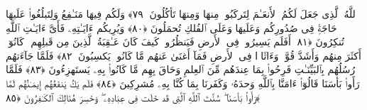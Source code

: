  ٱللَّهُ ٱلَّذِى جَعَلَ لَكُمُ ٱلأَنعَـٰمَ لِتَركَبُوا۟ مِنهَا وَمِنهَا تَأكُلُونَ ﴿٧٩﴾
 وَلَكُم فِيهَا مَنَـٰفِعُ وَلِتَبلُغُوا۟ عَلَيهَا حَاجَةًۭ فِى صُدُورِكُم وَعَلَيهَا وَعَلَى ٱلفُلكِ تُحمَلُونَ ﴿٨٠﴾
 وَيُرِيكُم ءَايَـٰتِهِۦ فَأَىَّ ءَايَـٰتِ ٱللَّهِ تُنكِرُونَ ﴿٨١﴾
 أَفَلَم يَسِيرُوا۟ فِى ٱلأَرضِ فَيَنظُرُوا۟ كَيفَ كَانَ عَـٰقِبَةُ ٱلَّذِينَ مِن قَبلِهِم ۚ كَانُوٓا۟ أَكثَرَ مِنهُم وَأَشَدَّ قُوَّةًۭ وَءَاثَارًۭا فِى ٱلأَرضِ فَمَآ أَغنَىٰ عَنهُم مَّا كَانُوا۟ يَكسِبُونَ ﴿٨٢﴾
 فَلَمَّا جَآءَتهُم رُسُلُهُم بِٱلبَيِّنَـٰتِ فَرِحُوا۟ بِمَا عِندَهُم مِّنَ ٱلعِلمِ وَحَاقَ بِهِم مَّا كَانُوا۟ بِهِۦ يَستَهزِءُونَ ﴿٨٣﴾
 فَلَمَّا رَأَوا۟ بَأسَنَا قَالُوٓا۟ ءَامَنَّا بِٱللَّهِ وَحدَهُۥ وَكَفَرنَا بِمَا كُنَّا بِهِۦ مُشرِكِينَ ﴿٨٤﴾
 فَلَم يَكُ يَنفَعُهُم إِيمَـٰنُهُم لَمَّا رَأَوا۟ بَأسَنَا ۖ سُنَّتَ ٱللَّهِ ٱلَّتِى قَد خَلَت فِى عِبَادِهِۦ ۖ وَخَسِرَ هُنَالِكَ ٱلكَـٰفِرُونَ ﴿٨٥﴾
 
